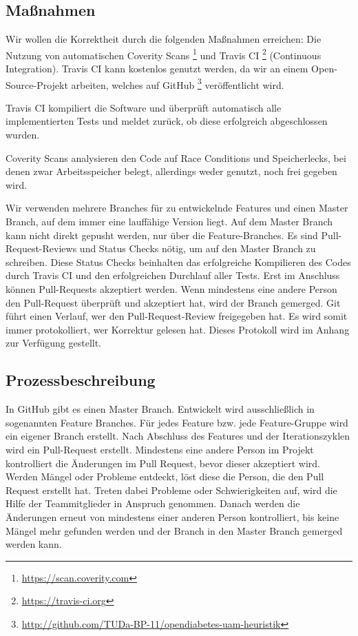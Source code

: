 \documentclass[accentcolor=tud0b,12pt,paper=a4]{tudreport}
\begin{document}
	\subsection{Maßnahmen}
Wir wollen die Korrektheit durch die folgenden Maßnahmen erreichen: Die Nutzung von automatischen Coverity Scans \footnote{\url{https://scan.coverity.com}} und Travis CI \footnote{\url{https://travis-ci.org}} (Continuous Integration). Travis CI kann kostenlos genutzt werden, da wir an einem Open-Source-Projekt arbeiten, welches auf GitHub \footnote{\url{http://github.com/TUDa-BP-11/opendiabetes-uam-heuristik}} veröffentlicht wird.

Travis CI kompiliert die Software und überprüft automatisch alle implementierten Tests und meldet zurück, ob diese erfolgreich abgeschlossen wurden. 

Coverity Scans analysieren den Code auf Race Conditions und Speicherlecks, bei denen zwar Arbeitsspeicher belegt, allerdings weder genutzt, noch frei gegeben wird. 

Wir verwenden mehrere Branches für zu entwickelnde Features und einen Master Branch, auf dem immer eine lauffähige Version liegt. Auf dem Master Branch kann nicht direkt gepusht werden, nur über die Feature-Branches. Es sind Pull-Request-Reviews und Status Checks nötig, um auf den Master Branch zu schreiben. Diese Status Checks beinhalten das erfolgreiche Kompilieren des Codes durch Travis CI und den erfolgreichen Durchlauf aller Tests. Erst im Anschluss können Pull-Requests akzeptiert werden. Wenn mindestens eine andere Person den Pull-Request überprüft und akzeptiert hat, wird der Branch gemerged. Git führt einen Verlauf, wer den Pull-Request-Review freigegeben hat. Es wird somit immer protokolliert, wer Korrektur gelesen hat. Dieses Protokoll wird im Anhang zur Verfügung gestellt.


	\subsection{Prozessbeschreibung}
In GitHub gibt es einen Master Branch. Entwickelt wird ausschließlich in sogenannten Feature Branches. Für jedes Feature bzw. jede Feature-Gruppe wird ein eigener Branch erstellt. Nach Abschluss des Features und der Iterationszyklen wird ein Pull-Request erstellt. Mindestens eine andere Person im Projekt kontrolliert die Änderungen im Pull Request, bevor dieser akzeptiert wird. Werden Mängel oder Probleme entdeckt, löst diese die Person, die den Pull Request erstellt hat. Treten dabei Probleme oder Schwierigkeiten auf, wird die Hilfe der Teammitglieder in Anspruch genommen. Danach werden die Änderungen erneut von mindestens einer anderen Person kontrolliert, bis keine Mängel mehr gefunden werden und der Branch in den Master Branch gemerged werden kann. 
\end{document}
